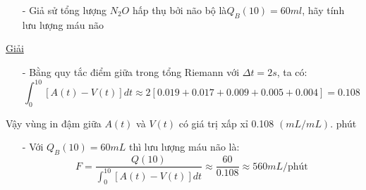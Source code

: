 \documentclass[12pt,a4paper]{article}
\begin{document}
\begin{enumerate}[a/]
\begin{itemize}
		      \item[-] Giả sử tổng lượng $N_2O$ hấp thụ bởi não bộ là$ Q_B(10)=60ml$, hãy tính lưu lượng máu não
	      \end{itemize}
	      \centering\underline{Giải}
	      \begin{itemize}
		      \item[-] Bằng quy tắc điểm giữa trong tổng Riemann với $\Delta t=2s$, ta có:
		            $$\int_{0}^{10}\left[A(t)-V(t)\right]dt\approx 2\left[0.019+0.017+0.009+0.005+0.004\right]=0.108$$
	      \end{itemize}
	      \begin{flushleft}
		      Vậy vùng in đậm giữa $A(t)$ và $V(t)$ có giá trị xấp xỉ 0.108 $(mL/mL)$. phút
	      \end{flushleft}
	      \begin{itemize}
		      \item[-] Với $Q_B(10)=60mL$ thì lưu lượng máu não là:
		            $$F=\frac{Q(10)}{\displaystyle \int_{0}^{10}\left[A(t)-V(t)\right]dt} \approx \frac{60}{0.108} \approx 560mL/\text{phút}$$
	      \end{itemize}
\end{enumerate}

\newpage
\end{document}
